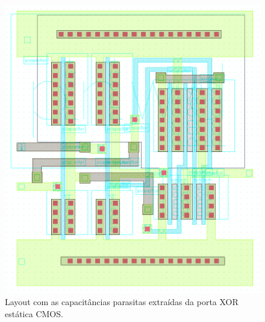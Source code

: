 \documentclass[a4paper,10pt] {article}
\begin{document}
\begin{figure}[h]
  \begin{minipage} [b] {0.48 \linewidth}
	\centering
	\includegraphics[scale=0.2]{xorStaticCMOSextracted.png}
	\caption{Layout com as capacitâncias parasitas extraídas da porta XOR estática CMOS.}
	\label{fig:xorStaticExtracted}
  \end{minipage}
  \begin{minipage} [b] {0.48 \linewidth}
	\centering

\end{minipage}
\end{figure}
\end{document}
